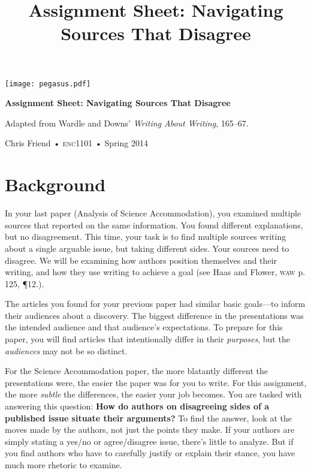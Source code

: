\documentclass[10pt, twosides]{amsart}	%
\title[Navigating Sources That Disagree]{Assignment Sheet: Navigating Sources That Disagree}
\begin{document}
%

\vspace{-2in}
\begin{center}
\huge
\texttt{[image: pegasus.pdf]}

\textbf{Assignment Sheet: Navigating Sources That Disagree}


{\normalsize Adapted from Wardle and Downs' \emph{Writing About Writing}, 165–67.

Chris Friend • \textsc{enc1101} • Spring 2014}
\end{center}
\vspace{1.5\baselineskip}
\thispagestyle{empty}

\section{Background} %
\label{sec:background}
In your last paper (Analysis of Science Accommodation), you examined multiple sources that reported on the same information. You found different explanations, but no disagreement. This time, your task is to find multiple sources writing about a single arguable issue, but taking different sides. Your sources need to disagree. We will be examining how authors position themselves and their writing, and how they use writing to achieve a goal (see Haas and Flower, \textsc{waw} p. 125, ¶12.).

The articles you found for your previous paper had similar basic goals---to inform their audiences about a discovery. The biggest difference in the presentations was the intended audience and that audience's expectations. To prepare for this paper, you will find articles that intentionally differ in their \emph{purposes}, but the \emph{audiences} may not be so distinct.

For the Science Accommodation paper, the more blatantly different the presentations were, the easier the paper was for you to write. For this assignment, the more \emph{subtle} the differences, the easier your job becomes. You are tasked with answering this question: \textbf{How do authors on disagreeing sides of a published issue situate their arguments?} To find the answer, look at the moves made by the authors, not just the points they make. If your authors are simply stating a yes/no or agree/disagree issue, there's little to analyze. But if you find authors who have to carefully justify or explain their stance, you have much more rhetoric to examine.
\end{document}
